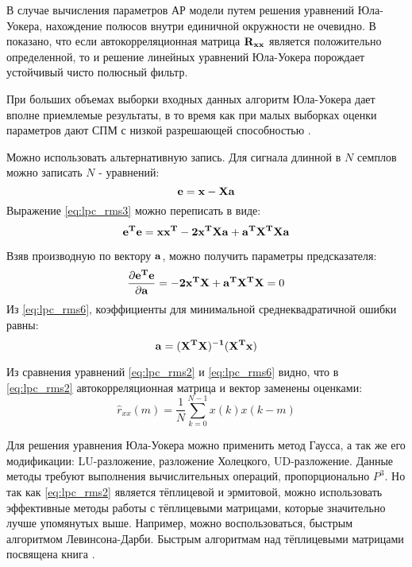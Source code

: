 В случае вычисления параметров АР модели путем решения уравнений Юла-Уокера, нахождение полюсов
внутри единичной окружности не очевидно. В \cite{shahtarin-spectrum-book} показано, что если
автокорреляционная матрица  ${{\bf R_{xx}}}$ является положительно определенной, то и решение
линейных уравнений Юла-Уокера порождает устойчивый чисто полюсный фильтр.

При больших объемах выборки входных данных алгоритм Юла-Уокера дает вполне приемлемые результаты, в то время
как при малых выборках оценки параметров дают СПМ с низкой разрешающей способностью \cite{marpl_book, bolshakov-book}.

Можно использовать альтернативную запись.  Для сигнала длинной в ${N}$ семплов можно записать ${N}$ - уравнений:
\begin{equation}
	\label{eq:lpc_rms3}
	{\bf e=x-Xa}
\end{equation}
Выражение \ref{eq:lpc_rms3} можно переписать в виде:
\begin{equation}
	\label{eq:lpc_rms4}
	{\bf e^T e = xx^T - 2x^T Xa + a^T X^T Xa}
\end{equation}

Взяв производную по вектору ${{\bf a}}$, можно получить параметры предсказателя:
\begin{equation}
	\label{eq:lpc_rms5}
	\frac{\partial {\bf e^T e}}{\partial {\bf a}} = {\bf - 2x^T X + a^T X^T X} = 0
\end{equation}
Из \ref{eq:lpc_rms6}, коэффициенты для минимальной среднеквадратичной ошибки равны:
\begin{equation}
	\label{eq:lpc_rms6}
	{\bf a= (X^T X)^{-1} (X^T x)}
\end{equation}

Из сравнения уравнений \ref{eq:lpc_rms2} и \ref{eq:lpc_rms6} видно, что в \ref{eq:lpc_rms2}
автокорреляционная матрица и вектор заменены оценками:
\begin{equation}
	\label{eq:lpc_rxx_estimation}
	\hat{r}_{xx}(m) = \frac{1}{N} \sum \limits_{k=0}^{N-1} x(k)x(k-m)
\end{equation}

Для решения уравнения Юла-Уокера можно применить метод Гаусса, а так же его модификации: LU-разложение,
разложение Холецкого, UD-разложение. Данные методы требуют выполнения вычислительных операций, пропорционально ${P^3}$.
Но так  как \ref{eq:lpc_rms2} является тёплицевой и эрмитовой, можно использовать эффективные методы работы
с тёплицевыми матрицами, которые значительно лучше упомянутых выше. 
Например, можно воспользоваться, быстрым алгоритмом Левинсона-Дарби.
Быстрым алгоритмам над тёплицевыми матрицами посвящена книга \cite{bleyhut_book}.

